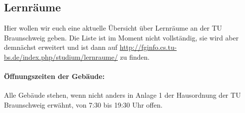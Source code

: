 \begin{multicols}{2}
\subsection{Lernräume}
Hier wollen wir euch eine aktuelle Übersicht über Lernräume an der TU
Braunschweig geben. Die Liste ist im Moment nicht vollständig, sie
wird aber demnächst erweitert und ist dann auf
\url{http://fginfo.cs.tu-bs.de/index.php/studium/lernraume/} zu finden.
\paragraph{Öffnungszeiten der Gebäude:}
Alle Gebäude stehen, wenn nicht anders in Anlage 1 der Hausordnung der
TU Braunschweig erwähnt, von 7:30 bis 19:30 Uhr offen.\end{multicols}
